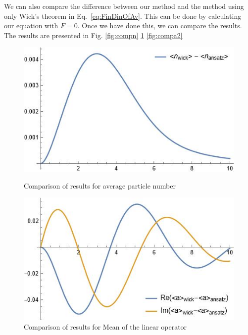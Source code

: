 \documentclass[12pt]{article}
\theoremstyle{definition}
\begin{document}
	We can also compare the difference between our method and the method using only Wick's theorem in  Eq.~\eqref{eq:FinDinOfAv}. This can be done by calculating our equation with $F = 0$. Once we have done this, we can compare the results. The results are presented in Fig. \ref{fig:compn} \ref{fig:compa} \ref{fig:compa2}
	
	
	\begin{figure}[h!]
		\begin{center}
			\begin{minipage}[h!]{0.45\linewidth}
				\includegraphics[width=1\linewidth]{Comparen.JPG}
				\caption{Comparison of results for average particle number}
				\label{fig:compn}
			\end{minipage}
			\hfil
			\begin{minipage}[h!]{0.45\linewidth}
				\includegraphics[width=1\linewidth]{Comparea.JPG}
				\caption{Comparison of results for Mean of the linear operator}
				\label{fig:compa}
			\end{minipage}
			\hfil
			\begin{minipage}[h!]{0.45\linewidth}

\end{minipage}
\end{center}
\end{figure}
\end{document}
